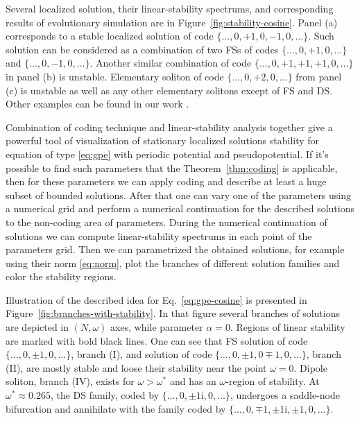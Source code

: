 Several localized solution, their linear-stability spectrums, and corresponding results of evolutionary simulation are in Figure~\ref{fig:stability-cosine}.
Panel (a) corresponds to a stable localized solution of code $\{ \dots, 0, +1, 0, -1, 0, \dots \}$.
Such solution can be considered as a combination of two FSs of codes $\{ \dots, 0, +1, 0, \dots \}$ and $\{ \dots, 0, -1, 0, \dots \}$.
Another similar combination of code $\{ \dots, 0, +1, +1, +1, 0, \dots \}$ in panel (b) is unstable.
Elementary soliton of code $\{ \dots, 0, +2, 0, \dots \}$ from panel (c) is unstable as well as any other elementary solitons except of FS and DS.
Other examples can be found in our work \cite{LebedevAlfimovMalomed}.

Combination of coding technique and linear-stability analysis together give a powerful tool of visualization of stationary localized solutions stability for equation of type \eqref{eq:gpe} with periodic potential and pseudopotential.
If it's possible to find such parameters that the Theorem~\ref{thm:coding} is applicable, then for these parameters we can apply coding and describe at least a huge subset of bounded solutions.
After that one can vary one of the parameters using a numerical grid and perform a numerical continuation for the described solutions to the non-coding area of parameters.
During the numerical continuation of solutions we can compute linear-stability spectrums in each point of the parameters grid.
Then we can parametrized the obtained solutions, for example using their norm \eqref{eq:norm}, plot the branches of different solution families and color the stability regions.

Illustration of the described idea for Eq.~\eqref{eq:gpe-cosine} is presented in Figure~\ref{fig:branches-with-stability}.
In that figure several branches of solutions are depicted in $(N, \omega)$ axes, while parameter $\alpha = 0$.
Regions of linear stability are marked with bold black lines.
One can see that FS solution of code $\{ \dots, 0, \pm 1, 0, \dots \}$, branch (I), and solution of code $\{ \dots, 0, \pm 1, 0 \mp 1, 0, \dots \}$, branch (II), are mostly stable and loose their stability near the point $\omega = 0$.
Dipole soliton, branch (IV), exists for $\omega > \omega^*$ and has an $\omega$-region of stability.
At $\omega^* \approx 0.265$, the DS family, coded by $\{ \dots, 0, \pm 1\mathrm{i}, 0, \dots \}$, undergoes a saddle-node bifurcation and annihilate with the family coded by $\{ \dots, 0, \mp 1, \pm 1\mathrm{i}, \pm 1, 0, \dots \}$.


